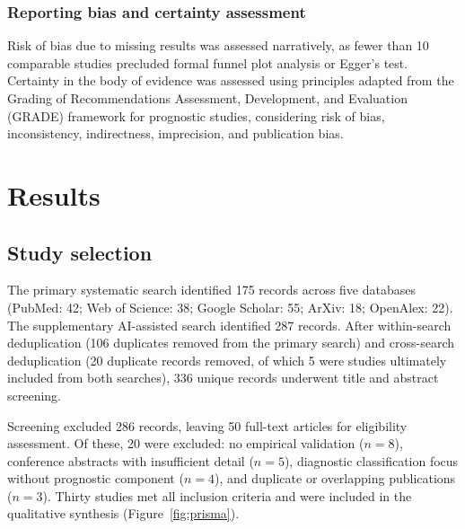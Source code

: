 \documentclass[11pt,a4paper]{article}
\begin{document}
\subsubsection{Reporting bias and certainty assessment}
Risk of bias due to missing results was assessed narratively, as fewer than 10 comparable studies precluded formal funnel plot analysis or Egger's test. Certainty in the body of evidence was assessed using principles adapted from the Grading of Recommendations Assessment, Development, and Evaluation (GRADE) framework for prognostic studies\cite{huguet2013}, considering risk of bias, inconsistency, indirectness, imprecision, and publication bias.

\section{Results}

\subsection{Study selection}

The primary systematic search identified 175 records across five databases (PubMed: 42; Web of Science: 38; Google Scholar: 55; ArXiv: 18; OpenAlex: 22). The supplementary AI-assisted search identified 287 records. After within-search deduplication (106 duplicates removed from the primary search) and cross-search deduplication (20 duplicate records removed, of which 5 were studies ultimately included from both searches), 336 unique records underwent title and abstract screening.

Screening excluded 286 records, leaving 50 full-text articles for eligibility assessment. Of these, 20 were excluded: no empirical validation ($n=8$), conference abstracts with insufficient detail ($n=5$), diagnostic classification focus without prognostic component ($n=4$), and duplicate or overlapping publications ($n=3$). Thirty studies met all inclusion criteria and were included in the qualitative synthesis (Figure~\ref{fig:prisma}).
\end{document}
